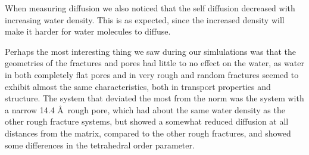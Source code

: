 When measuring diffusion we also noticed that the self diffusion decreased with increasing water density. This is as expected, since the increased density will make it harder for water molecules to diffuse.

Perhaps the most interesting thing we saw during our simlulations was that the geometries of the fractures and pores had little to no effect on the water, as water in both completely flat pores and in very rough and random fractures seemed to exhibit almost the same characteristics, both in transport properties and structure. The system that deviated the most from the norm was the system with a narrow 14.4 \AA\ rough pore, which had about the same water density as the other rough fracture systems, but showed a somewhat reduced diffusion at all distances from the matrix, compared to the other rough fractures, and showed some differences in the tetrahedral order parameter. 


% 







